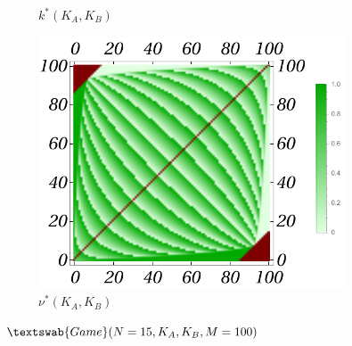 \documentclass{article}
\theoremstyle{definition}
\newcommand{\G}[1]{$\textswab{Game}(#1)$}
\begin{document}
\begin{figure}[H]
\begin{subfigure}[b]{0.3\textwidth}
        \caption{$k^*(K_A,K_B)$}
        \label{fig:sub25}
    \end{subfigure}
    \hfill %
    \begin{subfigure}[b]{0.3\textwidth}
        \includegraphics[width=\textwidth]{img/nu_Plot_15_100.pdf}
        \caption{$\nu^*(K_A,K_B)$}
        \label{fig:sub35}
    \end{subfigure}
    
    \caption{\G{N=15,K_A,K_B,M=100}}
    \label{fig:Game15__100_Pknu}
\end{figure}
\end{document}
